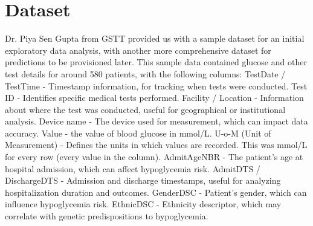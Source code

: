 \section{Dataset}

\par {
    Dr. Piya Sen Gupta from GSTT provided us with a sample dataset for an initial exploratory data analysis, with another more comprehensive dataset for predictions to be provisioned later. This sample data contained glucose and other test details for around 580 patients, with the following columns: 
TestDate / TestTime - Timestamp information, for tracking when tests were conducted.
Test ID - Identifies specific medical tests performed.
Facility / Location - Information about where the test was conducted, useful for geographical or institutional analysis.
Device name - The device used for measurement, which can impact data accuracy.
Value - the value of blood glucose in mmol/L.
U-o-M (Unit of Measurement) - Defines the units in which values are recorded. This was mmol/L for every row (every value in the column).  
AdmitAgeNBR - The patient's age at hospital admission, which can affect hypoglycemia risk.
AdmitDTS / DischargeDTS - Admission and discharge timestamps, useful for analyzing hospitalization duration and outcomes. 
GenderDSC - Patient’s gender, which can influence hypoglycemia risk.
EthnicDSC - Ethnicity descriptor, which may correlate with genetic predispositions to hypoglycemia.
}